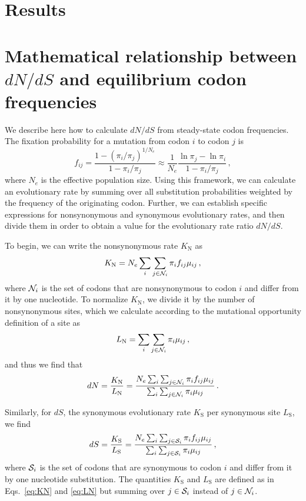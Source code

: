 \documentclass[11pt]{article}
\begin{document}
\section*{Results}


\section*{Mathematical relationship between $dN/dS$ and equilibrium codon frequencies}


We describe here how to calculate $dN/dS$ from steady-state codon frequencies. The fixation probability for a mutation from codon $i$ to codon $j$ is \cite{HalpernBruno1998,SellaHirsh2005}
\begin{equation}\label{eq:f_ij}
 f_{ij} = \frac{1-(\pi_i/\pi_j)^{1/N_e}}{1-\pi_i/\pi_j}
  \approx \frac{1}{N_e} \frac{\ln \pi_j - \ln \pi_i}{1-\pi_i/\pi_j}\,,
\end{equation}
where $N_e$ is the effective population size. Using this framework, we can calculate an evolutionary rate by summing over all substitution probabilities weighted by the frequency of the originating codon. Further, we can establish specific expressions for nonsynonymous and synonymous evolutionary rates, and then divide them in order to obtain a value for the evolutionary rate ratio $dN/dS$.

To begin, we can write the nonsynonymous rate $K_\text{N}$ as 
\begin{equation}\label{eq:KN}
  K_\text{N} = N_e \sum_i \sum_{j \in {\cal N}_i} \pi_i  f_{ij}\mu_{ij}\,,
\end{equation}
where ${\cal N}_i$ is the set of codons that are nonsynonymous to codon $i$ and differ from it by one nucleotide. To normalize $K_\text{N}$, we divide it by the number of nonsynonymous sites, which we calculate according to the mutational opportunity definition of a site \cite{GoldmanYang1994, Yang2006} as 
\begin{equation}\label{eq:LN}
  L_\text{N} = \sum_i \sum_{j \in {\cal N}_i} \pi_i \mu_{ij}\,, 
\end{equation} and thus we find that 
\begin{equation}\label{eq:dN}
  dN = \frac{K_\text{N}}{L_\text{N}}=\frac{ N_e \sum_i \sum_{j \in {\cal N}_i} \pi_i f_{ij} \mu_{ij} } {\sum_i \sum_{j \in {\cal N}_i} \pi_i \mu_{ij} }\,.
\end{equation}

Similarly, for $dS$, the synonymous evolutionary rate $K_\text{S}$ per synonymous site $L_\text{S}$, we find
\begin{equation}\label{eq:dS}
  dS = \frac{K_\text{S}}{L_\text{S}}=\frac{ N_e \sum_i \sum_{j \in {\cal S}_i} \pi_i f_{ij} \mu_{ij} } {\sum_i \sum_{j \in {\cal S}_i} \pi_i \mu_{ij} }\,,
\end{equation}
where ${\cal S}_i$ is the set of codons that are synonymous to codon $i$ and differ from it by one nucleotide substitution. The quantities $K_\text{S}$ and $L_\text{S}$ are defined as in Eqs.~\eqref{eq:KN} and \eqref{eq:LN} but summing over $j\in {\cal S}_i$ instead of $j\in {\cal N}_i$.
\end{document}
